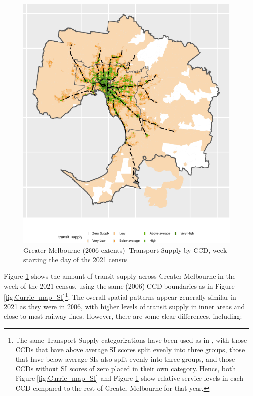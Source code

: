\documentclass[preprint, 3p,
authoryear]{elsarticle} %
\begin{document}
\begin{figure}
\includegraphics[width=1\linewidth]{Leveraging_GTFS_to_assess_transit_supply_Transport_Geography_files/figure-latex/Greater_Melbourne_CCD_2021-1} \caption{Greater Melbourne (2006 extents), Transport Supply by CCD, week starting the day of the 2021 census}\label{fig:Greater_Melbourne_CCD_2021}
\end{figure}

Figure \ref{fig:Greater_Melbourne_CCD_2021} shows the amount of transit
supply across Greater Melbourne in the week of the 2021 census, using
the same (2006) CCD boundaries as in Figure
\ref{fig:Currie_map_SI}\footnote{The same Transport Supply
  categorizations have been used as in \citet{currie2010identifying},
  with those CCDs that have above average SI scores split evenly into
  three groups, those that have below average SIs also split evenly into
  three groups, and those CCDs without SI scores of zero placed in their
  own category. Hence, both Figure \ref{fig:Currie_map_SI} and Figure
  \ref{fig:Greater_Melbourne_CCD_2021} show relative service levels in
  each CCD compared to the rest of Greater Melbourne for that year.}.
The overall spatial patterns appear generally similar in 2021 as they
were in 2006, with higher levels of transit supply in inner areas and
close to most railway lines. However, there are some clear differences,
including:
\end{document}
